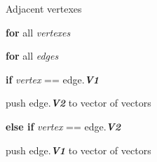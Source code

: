 \documentclass[../Head/Main.tex]{subfiles}
\begin{document}
\begin{Pseudo}{Adjacent vertexes}{}

 
 	\textbf{for} all \textit{vertexes}
	\begin{Indentation}
		\item 
	\begin{Indentation}
	\item \textbf{for} all \textit{edges}
	\item \textbf{if} \textit{vertex} == edge.\textbf{\textit{V1}}
		\item push edge.\textbf{\textit{V2}} to vector of vectors
	\item \textbf{else if} \textit{vertex} == edge.\textbf{\textit{V2}}
		\item push edge.\textbf{\textit{V1}} to vector of vectors

	\end{Indentation}
	
	\end{Indentation}

\end{Pseudo} 
\end{document}

